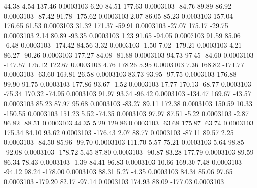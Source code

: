        44.38        4.54      137.46     0.0003103
        6.20       84.51      177.63     0.0003103
      -84.76       89.89       86.92     0.0003103
      -87.42       91.78     -175.62     0.0003103
        2.07       86.05       85.23     0.0003103
      157.04      176.65       61.53     0.0003103
       31.32      171.37      -59.91     0.0003103
      -27.07      175.17      -29.75     0.0003103
        2.14       80.89      -93.35     0.0003103
        1.23       91.65      -94.05     0.0003103
       91.59       85.06       -6.48     0.0003103
     -174.42       84.56        3.32     0.0003103
       -1.50        7.02     -179.21     0.0003103
        4.21       86.27      -90.26     0.0003103
      177.27       84.08      -81.88     0.0003103
       94.73       97.45      -84.60     0.0003103
     -147.57      175.12      122.67     0.0003103
        4.76      178.26        5.95     0.0003103
        7.36      168.82     -171.77     0.0003103
      -63.60      169.81       26.58     0.0003103
       83.73       93.95      -97.75     0.0003103
      176.88       99.90       91.75     0.0003103
      177.86       93.67       -1.52     0.0003103
       17.77      170.13      -68.77     0.0003103
      -75.34      170.32      -74.95     0.0003103
       91.97       93.34      -96.42     0.0003103
     -134.47      169.67      -43.57     0.0003103
       85.23       87.97       95.68     0.0003103
      -83.27       89.11      172.38     0.0003103
      150.59       10.33     -150.55     0.0003103
      161.23        5.52      -74.35     0.0003103
       97.97       87.51       -5.22     0.0003103
       -2.87       96.82      -88.51     0.0003103
       44.35        5.29      129.86     0.0003103
      -63.68      175.87      -63.74     0.0003103
      175.34       84.10       93.62     0.0003103
     -176.43        2.07       88.77     0.0003103
      -87.11       89.57        2.25     0.0003103
      -84.50       85.96      -99.70     0.0003103
      111.70        5.57       75.21     0.0003103
        5.64       98.85      -92.08     0.0003103
     -178.72        5.45       87.80     0.0003103
      -90.87       83.28      177.79     0.0003103
       89.59       86.34       78.43     0.0003103
       -1.39       84.41       96.83     0.0003103
       10.66      169.30        7.48     0.0003103
      -94.12       98.24     -178.00     0.0003103
       88.31        5.27       -4.35     0.0003103
       84.34       85.06       97.65     0.0003103
     -179.20       82.17      -97.14     0.0003103
      174.93       88.09     -177.03     0.0003103
